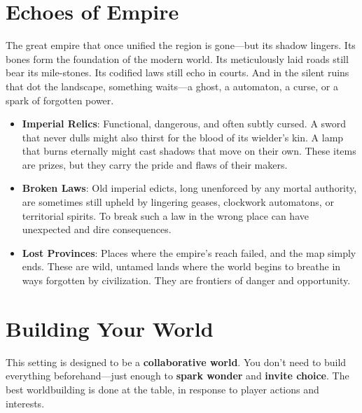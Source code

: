 \section*{Echoes of Empire}

The great empire that once unified the region is gone---but its shadow lingers. Its bones form the foundation of the modern world. Its meticulously laid roads still bear its mile-stones. Its codified laws still echo in courts. And in the silent ruins that dot the landscape, something waits—a ghost, a automaton, a curse, or a spark of forgotten power.

\begin{itemize}
    \item \textbf{Imperial Relics}: Functional, dangerous, and often subtly cursed. A sword that never dulls might also thirst for the blood of its wielder's kin. A lamp that burns eternally might cast shadows that move on their own. These items are prizes, but they carry the pride and flaws of their makers.
    \item \textbf{Broken Laws}: Old imperial edicts, long unenforced by any mortal authority, are sometimes still upheld by lingering geases, clockwork automatons, or territorial spirits. To break such a law in the wrong place can have unexpected and dire consequences.
    \item \textbf{Lost Provinces}: Places where the empire's reach failed, and the map simply ends. These are wild, untamed lands where the world begins to breathe in ways forgotten by civilization. They are frontiers of danger and opportunity.
\end{itemize}

\section*{Building Your World}

This setting is designed to be a \textbf{collaborative world}. You don't need to build everything beforehand---just enough to \textbf{spark wonder} and \textbf{invite choice}. The best worldbuilding is done at the table, in response to player actions and interests.

